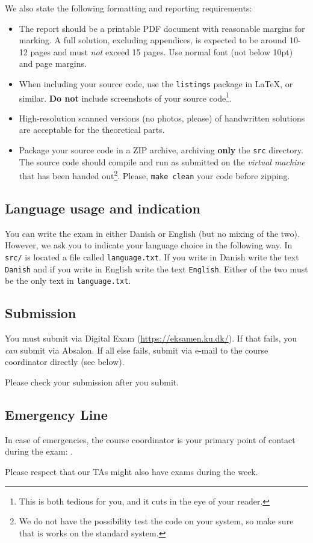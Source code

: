 \noindent We also state the following formatting and reporting requirements:

\begin{itemize}

\item The report should be a printable PDF document with reasonable margins for
marking. A full solution, excluding appendices, is expected to be around 10-12 pages and must \emph{not} exceed 15 pages. Use normal font (not below 10pt) and page margins.

\item When including your source code, use the \texttt{listings} package in
\LaTeX, or similar. \textbf{Do not} include screenshots of your source
code\footnote{This is both tedious for you, and it cuts in the eye of your
reader.}.

\item High-resolution scanned versions (no photos, please) of handwritten
solutions are acceptable for the theoretical parts.

\item Package your source code in a ZIP archive, archiving \textbf{only} the
\texttt{src} directory. The source code should compile and run as submitted on
the \emph{virtual machine} that has been handed out\footnote{We do not have the
possibility test the code on your system, so make sure that is works on the
standard system.}. Please, \verb+make clean+ your code before zipping.

\end{itemize}

\subsection*{Language usage and indication}

You can write the exam in either Danish or English (but no mixing of the two).
However, we ask you to indicate your language choice in the following way. In
\verb+src/+ is located a file called \verb+language.txt+. If you write in
Danish write the text \verb+Danish+ and if you write in English write the text
\verb+English+. Either of the two must be the only text in \verb+language.txt+.

\subsection*{Submission}

You must submit via Digital Exam (\url{https://eksamen.ku.dk/}). If that fails,
you \emph{can} submit via Absalon. If all else fails, submit via e-mail to the
course coordinator directly (see below).

Please check your submission after you submit.

\subsection*{Emergency Line}

In case of emergencies, the course coordinator is your primary point of contact
during the exam: \responsible{}.

Please respect that our TAs might also have exams during the week.
